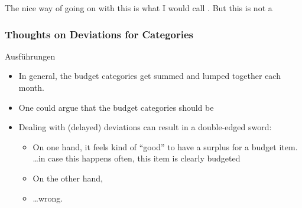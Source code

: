 The nice way of going on with this is what I would call .
But this is not a 

\subsubsection{Thoughts on Deviations for Categories}
\label{subsubsec:thoughts-deviations-for-categories}

Ausführungen
\begin{itemize}
	\item In general, the budget categories get summed and lumped together each month.
	\item One could argue that the budget categories should be 
	\item Dealing with (delayed) deviations can result in a double-edged sword:
	\begin{itemize}
		\item On one hand, it feels kind of ``good'' to have a surplus for a budget item.\\
		\ldots in case this happens often, this item is clearly budgeted
		\item On the other hand, 
		\item \ldots wrong.
	\end{itemize}
\end{itemize}